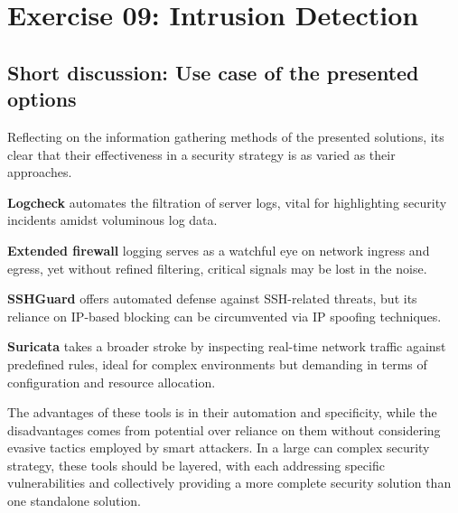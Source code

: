 \section{Exercise 09: Intrusion Detection}

\subsection{Short discussion: Use case of the presented options}
Reflecting on the information gathering methods of the presented solutions, its clear that their effectiveness in a security strategy is as varied as their approaches.

\textbf{Logcheck} automates the filtration of server logs, vital for highlighting security incidents amidst voluminous log data.

\textbf{Extended firewall} logging serves as a watchful eye on network ingress and egress, yet without refined filtering, critical signals may be lost in the noise.

\textbf{SSHGuard} offers automated defense against SSH-related threats, but its reliance on IP-based blocking can be circumvented via IP spoofing techniques.

\textbf{Suricata} takes a broader stroke by inspecting real-time network traffic against predefined rules,
ideal for complex environments but demanding in terms of configuration and resource allocation.

The advantages of these tools is in their automation and specificity, while the disadvantages comes from potential over reliance on them without considering
evasive tactics employed by smart attackers. In a large can complex security strategy, these tools should be layered,
with each addressing specific vulnerabilities and collectively providing a more complete security solution than one standalone solution.